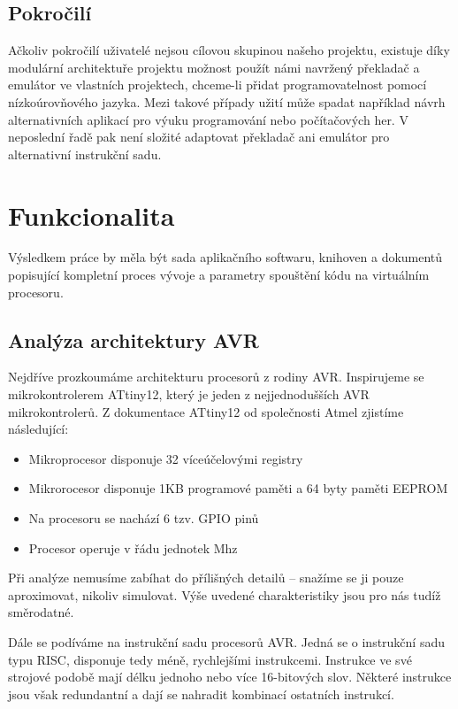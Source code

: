 \subsection{Pokročilí}

Ačkoliv pokročilí uživatelé nejsou cílovou skupinou našeho projektu, existuje díky modulární architektuře projektu možnost použít námi navržený překladač a emulátor ve vlastních projektech, chceme-li přidat programovatelnost pomocí nízkoúrovňového jazyka. Mezi takové případy užití může spadat například návrh alternativních aplikací pro výuku programování nebo počítačových her. V neposlední řadě pak není složité adaptovat překladač ani emulátor pro alternativní instrukční sadu.

\section{Funkcionalita}

Výsledkem práce by měla být sada aplikačního softwaru, knihoven a dokumentů popisující kompletní proces vývoje a parametry spouštění kódu na virtuálním procesoru.

\subsection{Analýza architektury AVR}

Nejdříve prozkoumáme architekturu procesorů z rodiny AVR. Inspirujeme se mikrokontrolerem ATtiny12, který je jeden z nejjednodušších AVR mikrokontrolerů. Z dokumentace ATtiny12 od společnosti Atmel\cite{attiny12-datasheet} zjistíme následující:

\begin{itemize}
	\item Mikroprocesor disponuje 32 víceúčelovými registry
	\item Mikrorocesor disponuje 1KB programové paměti a 64 byty paměti EEPROM
	\item Na procesoru se nachází 6 tzv. GPIO pinů
	\item Procesor operuje v řádu jednotek Mhz
\end{itemize}

Při analýze nemusíme zabíhat do přílišných detailů -- snažíme se ji pouze aproximovat, nikoliv simulovat. Výše uvedené charakteristiky jsou pro nás tudíž směrodatné.

Dále se podíváme na instrukční sadu procesorů AVR. Jedná se o instrukční sadu typu RISC, disponuje tedy méně, rychlejšími instrukcemi. Instrukce ve své strojové podobě mají délku jednoho nebo více 16-bitových slov. Některé instrukce jsou však redundantní a dají se nahradit kombinací ostatních instrukcí.

